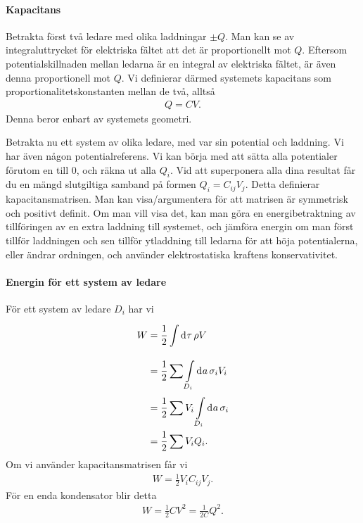 \paragraph{Kapacitans}
Betrakta först två ledare med olika laddningar $\pm Q$. Man kan se av integraluttrycket för elektriska fältet att det är proportionellt mot $Q$. Eftersom potentialskillnaden mellan ledarna är en integral av elektriska fältet, är även denna proportionell mot $Q$. Vi definierar därmed systemets kapacitans som proportionalitetskonstanten mellan de två, alltså
\begin{align*}
	Q = CV.
\end{align*}
Denna beror enbart av systemets geometri.

Betrakta nu ett system av olika ledare, med var sin potential och laddning. Vi har även någon potentialreferens. Vi kan börja med att sätta alla potentialer förutom en till $0$, och räkna ut alla $Q_{i}$. Vid att superponera alla dina resultat får du en mängd slutgiltiga samband på formen $Q_{i} = C_{ij}V_{j}$. Detta definierar kapacitansmatrisen. Man kan visa/argumentera för att matrisen är symmetrisk och positivt definit. Om man vill visa det, kan man göra en energibetraktning av tillföringen av en extra laddning till systemet, och jämföra energin om man först tillför laddningen och sen tillför ytladdning till ledarna för att höja potentialerna, eller ändrar ordningen, och använder elektrostatiska kraftens konservativitet.

\paragraph{Energin för ett system av ledare}
För ett system av ledare $D_{i}$ har vi
\begin{align*}
	W &= \frac{1}{2}\int\limits_{}^{}\dd[]{\tau}\rho V \\
	  &= \frac{1}{2}\sum\int\limits_{D_{i}}^{}\dd[]{a}\sigma_{i}V_{i} \\
	  &= \frac{1}{2}\sum V_{i}\int\limits_{D_{i}}^{}\dd[]{a}\sigma_{i} \\
	  &= \frac{1}{2}\sum V_{i}Q_{i}.
\end{align*}
Om vi använder kapacitansmatrisen får vi
\begin{align*}
	W = \frac{1}{2}V_{i}C_{ij}V_{j}.
\end{align*}
För en enda kondensator blir detta
\begin{align*}
	W = \frac{1}{2}CV^{2} = \frac{1}{2C}Q^{2}.
\end{align*}

